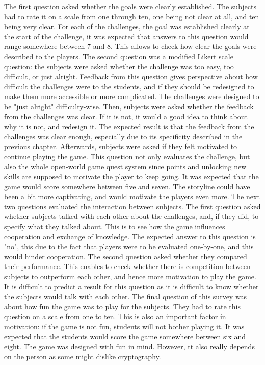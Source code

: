\documentclass{l4proj}
\begin{document}
The first question asked whether the goals were clearly established. 
The subjects had to rate it on a scale from one through ten, one being not clear at all, and ten being very clear.
For each of the challenges, the goal was established clearly at the start of the challenge, 
it was expected that answers to this question would range somewhere between 7 and 8.
This allows to check how clear the goals were described to the players.
The second question was a modified Likert scale question: 
the subjects were asked whether the challenge was too easy, too difficult, or just alright.
Feedback from this question gives perspective about how difficult the challenges were to the students,
and if they should be redesigned to make them more accessible or more complicated.
The challenges were designed to be "just alright" difficulty-wise.
Then, subjects were asked whether the feedback from the challenges was clear. 
If it is not, it would a good idea to think about why it is not, and redesign it.
The expected result is that the feedback from the challenges was clear enough, 
especially due to its specificity described in the previous chapter.
Afterwards, subjects were asked if they felt motivated to continue playing the game.
This question not only evaluates the challenge, but also the whole open-world game quest system since 
points and unlocking new skills are supposed to motivate the player to keep going.
It was expected that the game would score somewhere between five and seven.
The storyline could have been a bit more captivating, and would motivate the players even more.
The next two questions evaluated the interaction between subjects.
The first question asked whether subjects talked with each other about the challenges, and, if they did, 
to specify what they talked about. This is to see how the game influences cooperation and exchange of knowledge.
The expected answer to this question is "no", this due to the fact that players were to be evaluated one-by-one,
and this would hinder cooperation.
The second question asked whether they compared their performance. 
This enables to check whether there is competition between subjects to outperform each other, 
and hence more motivation to play the game.
It is difficult to predict a result for this question as it is difficult to know whether the subjects would talk with each other.
The final question of this survey was about how fun the game was to play for the subjects.
They had to rate this question on a scale from one to ten.
This is also an important factor in motivation: if the game is not fun, students will not bother playing it.
It was expected that the students would score the game somewhere between six and eight.
The game was designed with fun in mind. However,
tt also really depends on the person as some might dislike cryptography.
\end{document}
